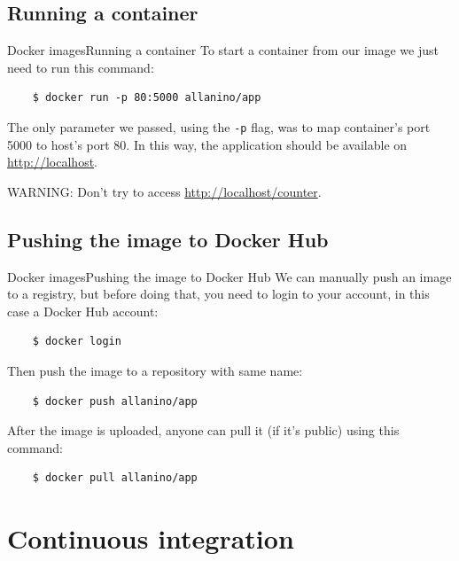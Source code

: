 \documentclass[10pt]{beamer}
\begin{document}
\subsection{Running a container}
\begin{frame}[fragile]{Docker images}{Running a container}
	To start a container from our image we just need to run this command:
	\begin{verbatim}
	$ docker run -p 80:5000 allanino/app
	\end{verbatim}
	
	The only parameter we passed, using the \texttt{-p} flag, was to map container's port 5000 to host's port 80. In this way, the application should be available on \url{http://localhost}.
	
	\vspace{0.5cm}
	WARNING: Don't try to access \url{http://localhost/counter}.
\end{frame}
\subsection{Pushing the image to Docker Hub}
\begin{frame}[fragile]{Docker images}{Pushing the image to Docker Hub}
	We can manually push an image to a registry, but before doing that, you need to login to your account, in this case a Docker Hub account:
	
	\begin{verbatim}
	$ docker login
	\end{verbatim}

	Then push the image to a repository with same name:
	\begin{verbatim}
	$ docker push allanino/app
	\end{verbatim}
	
	
	After the image is uploaded, anyone can pull it (if it's public) using this command:
	\begin{verbatim}
	$ docker pull allanino/app
	\end{verbatim}
\end{frame}

\section{Continuous integration}
\end{document}
